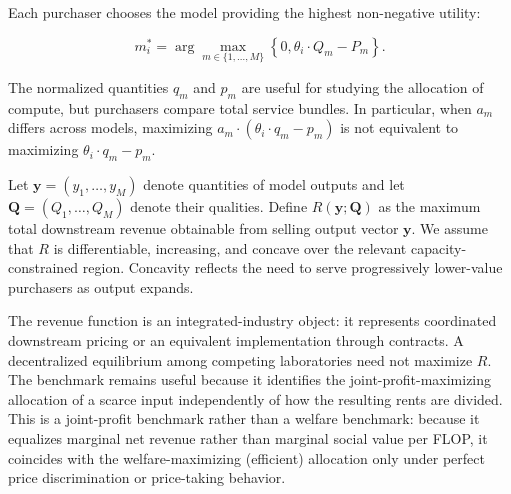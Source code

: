 \documentclass[11pt]{article}
\begin{document}
Each purchaser chooses the model providing the highest non-negative utility:

\begin{equation}m_i^*=\arg\max_{m\in\{1,\ldots,M\}}\left\{0,\theta_i\cdot Q_m-P_m\right\}.\end{equation}

The normalized quantities $q_m$ and $p_m$ are useful for studying the allocation of compute, but purchasers compare total service bundles. In particular, when $a_m$ differs across models, maximizing $a_m\cdot(\theta_i\cdot q_m-p_m)$ is not equivalent to maximizing $\theta_i\cdot q_m-p_m$.

Let $\mathbf y=(y_1,\ldots,y_M)$ denote quantities of model outputs and let $\mathbf Q=(Q_1,\ldots,Q_M)$ denote their qualities. Define $R(\mathbf y;\mathbf Q)$ as the maximum total downstream revenue obtainable from selling output vector $\mathbf y$. We assume that $R$ is differentiable, increasing, and concave over the relevant capacity-constrained region. Concavity reflects the need to serve progressively lower-value purchasers as output expands.

The revenue function is an integrated-industry object: it represents coordinated downstream pricing or an equivalent implementation through contracts. A decentralized equilibrium among competing laboratories need not maximize $R$. The benchmark remains useful because it identifies the joint-profit-maximizing allocation of a scarce input independently of how the resulting rents are divided. This is a joint-profit benchmark rather than a welfare benchmark: because it equalizes marginal net revenue rather than marginal social value per FLOP, it coincides with the welfare-maximizing (efficient) allocation only under perfect price discrimination or price-taking behavior.
\end{document}
